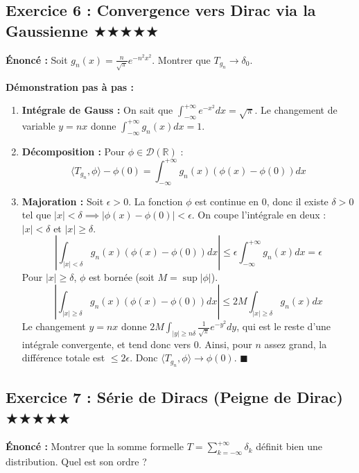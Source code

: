 \documentclass[11pt,a4paper]{article}
\begin{document}
\subsection*{Exercice 6 : Convergence vers Dirac via la Gaussienne \quad $\bigstar\bigstar\bigstar\bigstar\bigstar$}

\textbf{Énoncé :}
Soit $g_n(x) = \frac{n}{\sqrt{\pi}} e^{-n^2 x^2}$. Montrer que $T_{g_n} \to \delta_0$.

\textbf{Démonstration pas à pas :}
\begin{enumerate}
\item \textbf{Intégrale de Gauss :} On sait que $\int_{-\infty}^{+\infty} e^{-x^2} dx = \sqrt{\pi}$. Le changement de variable $y = nx$ donne $\int_{-\infty}^{+\infty} g_n(x) dx = 1$.
\item \textbf{Décomposition :} Pour $\phi \in \mathcal{D}(\mathbb{R})$ :
   $$ \langle T_{g_n}, \phi \rangle - \phi(0) = \int_{-\infty}^{+\infty} g_n(x) (\phi(x) - \phi(0)) dx $$
\item \textbf{Majoration :} Soit $\epsilon > 0$. La fonction $\phi$ est continue en 0, donc il existe $\delta > 0$ tel que $|x| < \delta \implies |\phi(x) - \phi(0)| < \epsilon$.
   On coupe l'intégrale en deux : $|x| < \delta$ et $|x| \ge \delta$.
   $$ \left| \int_{|x| < \delta} g_n(x)(\phi(x)-\phi(0)) dx \right| \le \epsilon \int_{-\infty}^{+\infty} g_n(x) dx = \epsilon $$
   Pour $|x| \ge \delta$, $\phi$ est bornée (soit $M = \sup |\phi|$).
   $$ \left| \int_{|x| \ge \delta} g_n(x)(\phi(x)-\phi(0)) dx \right| \le 2M \int_{|x| \ge \delta} g_n(x) dx $$
   Le changement $y = nx$ donne $2M \int_{|y| \ge n\delta} \frac{1}{\sqrt{\pi}} e^{-y^2} dy$, qui est le reste d'une intégrale convergente, et tend donc vers 0.
   Ainsi, pour $n$ assez grand, la différence totale est $\le 2\epsilon$.
   Donc $\langle T_{g_n}, \phi \rangle \to \phi(0)$. $\blacksquare$
\end{enumerate}




\subsection*{Exercice 7 : Série de Diracs (Peigne de Dirac) \quad $\bigstar\bigstar\bigstar\bigstar\bigstar$}

\textbf{Énoncé :}
Montrer que la somme formelle $T = \sum_{k=-\infty}^{+\infty} \delta_k$ définit bien une distribution. Quel est son ordre ?
\end{document}
